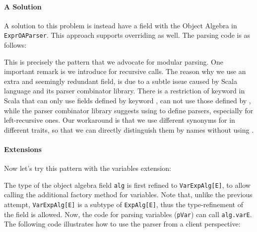 
\paragraph{A Solution}
A solution to this problem is instead have a field with the Object Algebra
in \lstinline{ExprOAParser}. This approach supports overriding as well.
The parsing code is as follows:

This is precisely the pattern that we advocate for modular parsing.
One important remark is we introduce  for recursive calls.
The reason why we use an extra and seemingly redundant field, is due to a subtle issue caused by Scala language and its parser combinator library. There is a restriction of  keyword in Scala that  can only use fields defined by keyword , can not use those defined by , while the parser combinator library suggests using  to define parsers, especially for left-recursive ones. Our workaround is that we use different synonyms for  in different traits, so that we can directly distinguish them by names without using .

\paragraph{Extensions}
Now let's try this pattern with the variables extension:

\noindent The type of the object algebra field \lstinline{alg} is first refined
to \lstinline{VarExpAlg[E]}, to allow calling the additional factory method
for variables. Note that, unlike the previous attempt, \lstinline{VarExpAlg[E]}
is a subtype of \lstinline{ExpAlg[E]}, thus the type-refinement of the
field is allowed. Now, the code for parsing variables (\lstinline{pVar}) can
call \lstinline{alg.varE}. The following code illustrates how to use
the parser from a client perspective:


